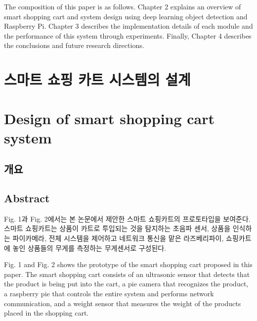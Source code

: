 \documentclass[smallextended]{svjour3}       %
\begin{document}
The composition of this paper is as follows. Chapter 2 explains an
overview of smart shopping cart and system design using deep learning
object detection and Raspberry Pi. Chapter 3 describes the
implementation details of each module and the performance of this system
through experiments. Finally, Chapter 4 describes the conclusions and
future research directions.

\hypertarget{uxc2a4uxb9c8uxd2b8-uxc1fcuxd551-uxce74uxd2b8-uxc2dcuxc2a4uxd15cuxc758-uxc124uxacc4}{%
\section{스마트 쇼핑 카트 시스템의
설계}\label{uxc2a4uxb9c8uxd2b8-uxc1fcuxd551-uxce74uxd2b8-uxc2dcuxc2a4uxd15cuxc758-uxc124uxacc4}}

\hypertarget{design-of-smart-shopping-cart-system}{%
\section{Design of smart shopping cart
system}\label{design-of-smart-shopping-cart-system}}

\hypertarget{uxac1cuxc694}{%
\subsection{개요}\label{uxac1cuxc694}}

\hypertarget{abstract}{%
\subsection{Abstract}\label{abstract}}

Fig. 1과 Fig. 2에서는 본 논문에서 제안한 스마트 쇼핑카트의 프로토타입을
보여준다. 스마트 쇼핑카트는 상품이 카트로 투입되는 것을 탐지하는 초음파
센서, 상품을 인식하는 파이카메라, 전체 시스템을 제어하고 네트워크 통신을
맡은 라즈베리파이, 쇼핑카트에 놓인 상품들의 무게를 측정하는 무게센서로
구성된다.

Fig. 1 and Fig. 2 shows the prototype of the smart shopping cart
proposed in this paper. The smart shopping cart consists of an
ultrasonic sensor that detects that the product is being put into the
cart, a pie camera that recognizes the product, a raspberry pie that
controls the entire system and performs network communication, and a
weight sensor that measures the weight of the products placed in the
shopping cart.
\end{document}
